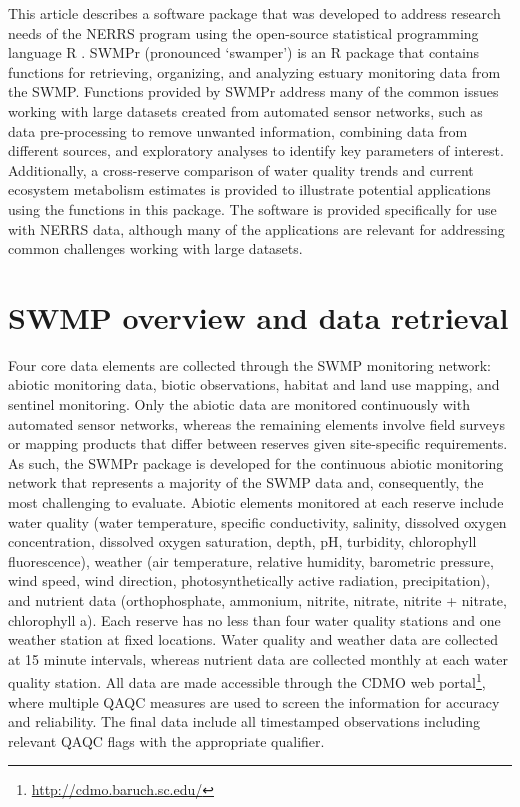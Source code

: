 \documentclass[10pt,letterpaper]{article}\usepackage[]{graphicx}\usepackage[]{color}
\begin{document}
This article describes a software package that was developed to address research needs of the \ac{NERRS} program using the open-source statistical programming language R \cite{RDCT14}.  SWMPr (pronounced `swamper') is an R package that contains functions for retrieving, organizing, and analyzing estuary monitoring data from the \acl{SWMP}.  Functions provided by SWMPr address many of the common issues working with large datasets created from automated sensor networks, such as data pre-processing to remove unwanted information, combining data from different sources, and exploratory analyses to identify key parameters of interest.  Additionally, a cross-reserve comparison of water quality trends and current ecosystem metabolism estimates is provided to illustrate potential applications using the functions in this package.  The software is provided specifically for use with \ac{NERRS} data, although many of the applications are relevant for addressing common challenges working with large datasets.

\section*{SWMP overview and data retrieval}

Four core data elements are collected through the \ac{SWMP} monitoring network: abiotic monitoring data, biotic observations, habitat and land use mapping, and sentinel monitoring.  Only the abiotic data are monitored continuously with automated sensor networks, whereas the remaining elements involve field surveys or mapping products that differ between reserves given site-specific requirements.  As such, the SWMPr package is developed for the continuous abiotic monitoring network that represents a majority of the \ac{SWMP} data and, consequently, the most challenging to evaluate.  Abiotic elements monitored at each reserve include water quality (water temperature, specific conductivity, salinity, dissolved oxygen concentration, dissolved oxygen saturation, depth, pH, turbidity, chlorophyll fluorescence), weather (air temperature, relative humidity, barometric pressure, wind speed, wind direction, photosynthetically active radiation, precipitation), and nutrient data (orthophosphate, ammonium, nitrite, nitrate, nitrite + nitrate, chlorophyll a).  Each reserve has no less than four water quality stations and one weather station at fixed locations.  Water quality and weather data are collected at 15 minute intervals, whereas nutrient data are collected monthly at each water quality station.  All data are made accessible through the \ac{CDMO} web portal\footnote{\url{http://cdmo.baruch.sc.edu/}}, where multiple \ac{QAQC} measures are used to screen the information for accuracy and reliability.  The final data include all timestamped observations including relevant \ac{QAQC} flags with the appropriate qualifier.
\end{document}
